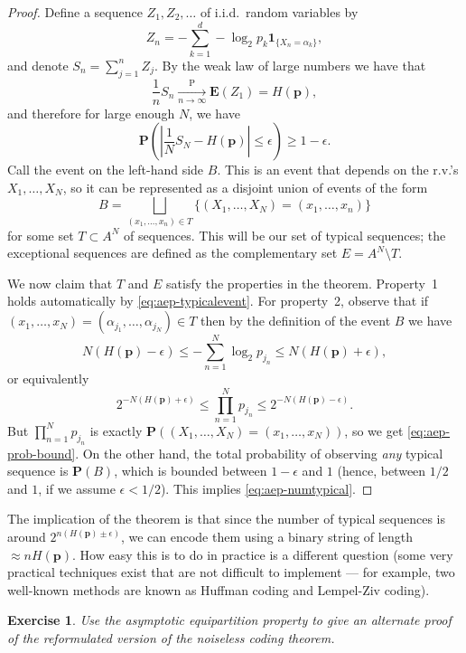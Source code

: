 \documentclass[12pt]{article}
\newtheorem{exercise}[thm]{Exercise}
\newcommand{\prob}{\mathbf{P}}
\newcommand{\expec}{\mathbf{E}}
\newcommand{\ind}{\textbf{1}}
\theoremstyle{example}
\begin{document}
\begin{proof} Define a sequence $Z_1, Z_2, \ldots $ of i.i.d.\ random variables by
$$ Z_n = -\sum_{k=1}^d -\log_2 p_k \ind_{\{X_n = \alpha_k\}}, $$
and denote $S_n = \sum_{j=1}^n Z_j$. By the weak law of large numbers we have that
$$ \frac{1}{n} S_n \xrightarrow[n\to\infty]{\textrm{P}} \expec(Z_1) = H(\mathbf{p}), $$
and therefore for large enough $N$, we have
\begin{equation} \label{eq:aep-typicalevent}
\prob\left(\left|\frac{1}{N}S_N- H(\mathbf{p})\right|\le \epsilon \right)\ge 1-\epsilon.
\end{equation}
Call the event on the left-hand side $B$. This is an event that depends on the r.v.'s $X_1,\ldots,X_N$, so it can be represented as a disjoint union of events of the form
$$ B = \bigsqcup_{(x_1,\ldots,x_n)\in T} \{ (X_1,\ldots,X_N) = (x_1,\ldots,x_n) \} $$
for some set $T\subset A^N$ of sequences. This will be our set of typical sequences; the exceptional sequences are defined as the complementary set $E = A^N\setminus T$.

We now claim that $T$ and $E$ satisfy the properties in the theorem. Property~1 holds automatically by \eqref{eq:aep-typicalevent}. For property~2, observe that if $(x_1,\ldots,x_N)=(\alpha_{j_1},\ldots,\alpha_{j_N})\in T$ then by the definition of the event $B$ we have
$$
N\left(H(\mathbf{p}) - \epsilon\right) \le 
-\sum_{n=1}^N \log_2 p_{j_n} \le N\left(H(\mathbf{p}) + \epsilon\right),
$$
or equivalently
$$
2^{-N\left(H(\mathbf{p}) + \epsilon\right)} \le 
\prod_{n=1}^N p_{j_n} \le 
2^{-N\left(H(\mathbf{p}) - \epsilon\right)}.
$$
But $\prod_{n=1}^N p_{j_n}$ is exactly $\prob((X_1,\ldots,X_N)=(x_1,\ldots,x_N))$, so we get \eqref{eq:aep-prob-bound}.
On the other hand, the total probability of observing \emph{any} typical sequence is $\prob(B)$, which is bounded between $1-\epsilon$ and $1$ (hence, between $1/2$ and $1$, if we assume $\epsilon<1/2$). This implies \eqref{eq:aep-numtypical}.
\end{proof}

The implication of the theorem is that since the number of typical sequences is around $2^{n(H(\mathbf{p})\pm \epsilon)}$, we can encode them using a binary string of length $\approx nH(\mathbf{p})$. How easy this is to do in practice is a different question (some very practical techniques exist that are not difficult to implement --- for example, two well-known methods are known as Huffman coding and Lempel-Ziv coding).

\begin{exercise} Use the asymptotic equipartition property to give an alternate proof of the reformulated version of the noiseless coding theorem.
\end{exercise}
\end{document}
